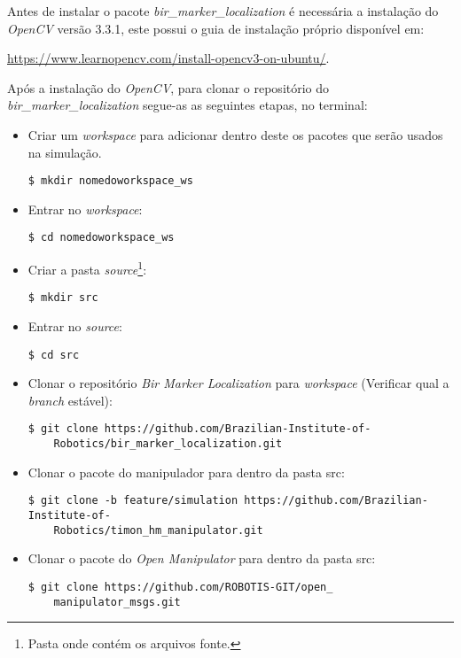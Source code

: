 Antes de instalar o pacote \textit{bir\_marker\_localization} é necessária a instalação do \textit{\acs{OpenCV}} versão 3.3.1, este possui o guia de instalação próprio disponível em:

\url{https://www.learnopencv.com/install-opencv3-on-ubuntu/}.

Após a instalação do \textit{\acs{OpenCV}}, para clonar o repositório do \textit{bir\_marker\_localization} segue-as as seguintes etapas, no terminal:

\begin{itemize}
  \item Criar um \textit{workspace} para adicionar dentro deste os pacotes que serão usados na simulação.
  \begin{lstlisting}[frame=single]
    $ mkdir nomedoworkspace_ws
  \end{lstlisting}
  \item Entrar no \textit{workspace}:
  \begin{lstlisting}[frame=single]
    $ cd nomedoworkspace_ws
  \end{lstlisting}
  \item Criar a pasta \textit{source}\footnote{Pasta onde contém os arquivos fonte.}:
  \begin{lstlisting}[frame=single]
    $ mkdir src
  \end{lstlisting}
  \item Entrar no \textit{source}:
  \begin{lstlisting}[frame=single]
    $ cd src
  \end{lstlisting}
  \item Clonar o repositório \textit{Bir Marker Localization} para \textit{workspace} (Verificar qual a \textit{branch} estável):
  \begin{lstlisting}[frame=single]
    $ git clone https://github.com/Brazilian-Institute-of-
    Robotics/bir_marker_localization.git
  \end{lstlisting}
  
  \item Clonar o pacote do manipulador para dentro da pasta src:
  \begin{lstlisting}[frame=single]
    $ git clone -b feature/simulation https://github.com/Brazilian-Institute-of-
    Robotics/timon_hm_manipulator.git
  \end{lstlisting}

  \item Clonar o pacote do \textit{Open Manipulator} para dentro da pasta src:
  \begin{lstlisting}[frame=single]
    $ git clone https://github.com/ROBOTIS-GIT/open_
    manipulator_msgs.git
  \end{lstlisting}


\end{itemize}
